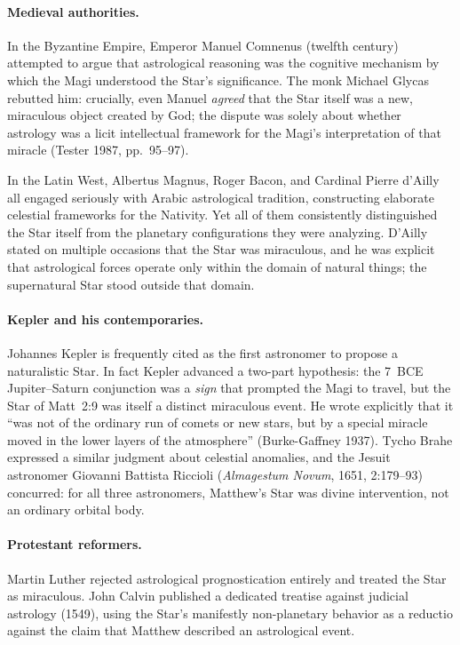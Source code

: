 \documentclass[11pt,a4paper]{article}
\begin{document}
\paragraph{Medieval authorities.}
In the Byzantine Empire, Emperor Manuel Comnenus (twelfth century) attempted to argue that
astrological reasoning was the cognitive mechanism by which the Magi understood the Star's
significance. The monk Michael Glycas rebutted him: crucially, even Manuel \emph{agreed} that
the Star itself was a new, miraculous object created by God; the dispute was solely about whether
astrology was a licit intellectual framework for the Magi's interpretation of that miracle
(Tester 1987, pp.~95--97)\cite{tester1987}.

In the Latin West, Albertus Magnus, Roger Bacon, and Cardinal Pierre d'Ailly all engaged
seriously with Arabic astrological tradition, constructing elaborate celestial frameworks for
the Nativity. Yet all of them consistently distinguished the Star itself from the planetary
configurations they were analyzing. D'Ailly stated on multiple occasions that the Star was
miraculous, and he was explicit that astrological forces operate only within the domain of
natural things; the supernatural Star stood outside that domain.

\paragraph{Kepler and his contemporaries.}
Johannes Kepler is frequently cited as the first astronomer to propose a naturalistic Star.
In fact Kepler advanced a two-part hypothesis: the 7~BCE Jupiter--Saturn conjunction was a
\emph{sign} that prompted the Magi to travel, but the Star of Matt~2:9 was itself a distinct
miraculous event. He wrote explicitly that it ``was not of the ordinary run of comets or new
stars, but by a special miracle moved in the lower layers of the atmosphere''
(Burke-Gaffney 1937)\cite{kepler1606}. Tycho Brahe expressed a similar judgment about
celestial anomalies, and the Jesuit astronomer Giovanni Battista Riccioli
(\textit{Almagestum Novum}, 1651, 2:179--93) concurred: for all three astronomers,
Matthew's Star was divine intervention, not an ordinary orbital body.

\paragraph{Protestant reformers.}
Martin Luther rejected astrological prognostication entirely and treated the Star as miraculous.
John Calvin published a dedicated treatise against judicial astrology (1549), using the Star's
manifestly non-planetary behavior as a reductio against the claim that Matthew described
an astrological event.
\end{document}
